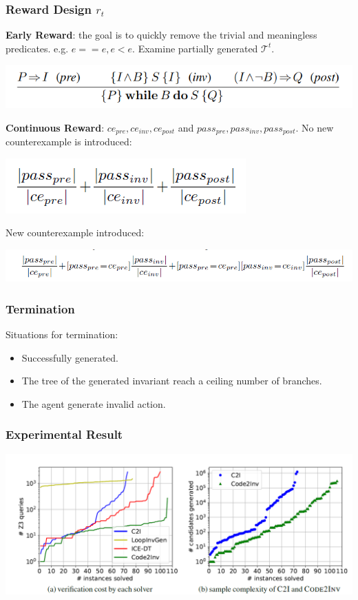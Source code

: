 \documentclass[11pt]{beamer}
\begin{document}
\begin{frame}\frametitle{Reward Design $r_t$}
\textbf{Early Reward}: the goal is to quickly remove the trivial and meaningless predicates. e.g. $e == e, e < e$. Examine partially generated $\mathcal{T}^t$.


\begin{center}
\includegraphics[scale=0.4]{inv.png}
\end{center}
\textbf{Continuous Reward}: $ce_{pre}, ce_{inv}, ce_{post}$ and $pass_{pre}, pass_{inv}, pass_{post}$.
No new counterexample is introduced: 
\begin{center}
\includegraphics[scale = 0.5]{7.png}
\end{center}
New counterexample introduced: 
\begin{center}
\includegraphics[scale=0.5]{8.png}

\end{center}
\end{frame}


\begin{frame}\frametitle{Termination}
Situations for termination:
\begin{itemize}
\item Successfully generated.
\item The tree of the generated invariant reach a ceiling number of branches.
\item The agent generate invalid action.

\end{itemize}

\end{frame}
\begin{frame}\frametitle{Experimental Result}

\begin{center}

\includegraphics[scale = 0.35]{10.png}
\end{center}

\end{frame}
\end{document}
